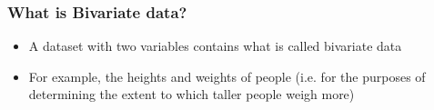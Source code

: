 \documentclass{beamer}
\begin{document}
\begin{frame}
\frametitle{What is Bivariate data?}
\large

\begin{itemize}


\item A dataset with two variables contains what is called bivariate data 
\item For example, the heights and weights of people (i.e. for the purposes of determining the extent to which taller people weigh more)

\end{itemize}
\end{frame}
\end{document}
